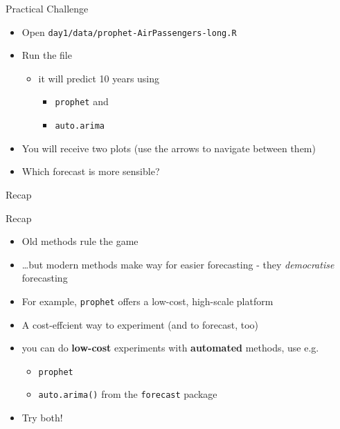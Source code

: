 \documentclass[ignorenonframetext,]{beamer}
\providecommand{\tightlist}{%
  \setlength{\itemsep}{0pt}\setlength{\parskip}{0pt}}
\begin{document}
\begin{frame}[fragile]{Practical Challenge}

\begin{itemize}
\tightlist
\item
  Open \texttt{day1/data/prophet-AirPassengers-long.R}
\item
  Run the file

  \begin{itemize}
  \tightlist
  \item
    it will predict 10 years using

    \begin{itemize}
    \tightlist
    \item
      \texttt{prophet} and
    \item
      \texttt{auto.arima}
    \end{itemize}
  \end{itemize}
\item
  You will receive two plots (use the arrows to navigate between them)
\item
  Which forecast is more sensible?
\end{itemize}

\end{frame}

\begin{frame}[fragile]{Recap}

\begin{block}{Recap}

\begin{itemize}
\tightlist
\item
  Old methods rule the game
\item
  \ldots{}but modern methods make way for easier forecasting - they
  \emph{democratise} forecasting
\item
  For example, \texttt{prophet} offers a low-cost, high-scale platform
\item
  A cost-effcient way to experiment (and to forecast, too)
\item
  you can do \textbf{low-cost} experiments with \textbf{automated}
  methods, use e.g.

  \begin{itemize}
  \tightlist
  \item
    \texttt{prophet}
  \item
    \texttt{auto.arima()} from the \texttt{forecast} package
  \end{itemize}
\item
  Try both!
\end{itemize}

\end{block}

\end{frame}
\end{document}
